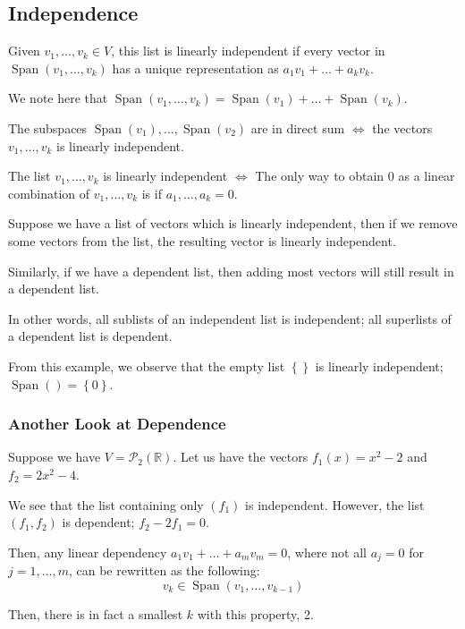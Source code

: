 \documentclass[openany]{book}
\newcommand{\RR}{\mathbb{R}}
\DeclareMathOperator*{\Span}{Span}
\begin{document}
\subsection{Independence}
\begin{defn}
	Given $v_{1}, \ldots, v_{k} \in V$, this list is linearly independent if every vector in $\Span(v_{1}, \ldots, v_{k})$ has a unique representation as $a_{1}v_{1} + \ldots + a_{k}v_{k}$.
	
	We note here that $\Span(v_{1}, \ldots, v_{k}) = \Span(v_{1}) + \ldots + \Span(v_{k})$.
\end{defn}
\begin{thm}
	The subspaces $\Span(v_{1}), \ldots, \Span(v_{2})$ are in direct sum $\iff$ the vectors $v_{1}, \ldots, v_{k}$ is linearly independent.
\end{thm}
\begin{thm}
	The list $v_{1}, \ldots, v_{k}$ is linearly independent $\iff$ The only way to obtain $0$ as a linear combination of $v_{1}, \ldots, v_{k}$ is if $a_{1}, \ldots, a_{k} = 0$.
\end{thm}
\begin{example}
	Suppose we have a list of vectors which is linearly independent, then if we remove some vectors from the list, the resulting vector is linearly independent.
	
	Similarly, if we have a dependent list, then adding most vectors will still result in a dependent list.
	
	In other words, all sublists of an independent list is independent; all superlists of a dependent list is dependent.
\end{example}
\begin{rmk}
	From this example, we observe that the empty list $\left\{  \right\}$ is linearly independent; $\Span() = \left\{  0\right\}$.
\end{rmk}

\subsubsection{Another Look at Dependence}
\begin{example}
	Suppose we have $V = \mathscr{P}_{2}(\RR)$. Let us have the vectors $f_{1}(x) = x^{2}- 2$ and $f_{2} = 2x^{2} - 4$.
	
	We see that the list containing only $(f_{1})$ is independent. However, the list $(f_{1}, f_{2})$ is dependent; $f_{2} - 2f_{1} = 0$.
	
	Then, any linear dependency $a_{1}v_{1} + \ldots + a_{m}v_{m} = 0$, where not all $a_{j} = 0$ for $j = 1, \ldots, m$, can be rewritten as the following:
	\begin{equation*}
		v_{k} \in \Span\left( v_{1}, \ldots, v_{k-1} \right) \tag{for some $k \leq m$}
	\end{equation*}

	Then, there is in fact a smallest $k$ with this property, 2.
\end{example}
\end{document}
